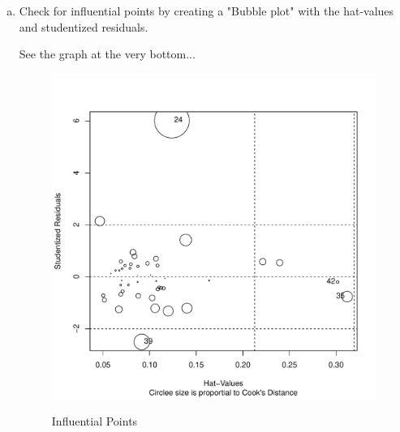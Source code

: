 \documentclass[12pt,letterpaper]{article}
\begin{document}
\begin{enumerate}[(a)]
\item Check for influential points by creating a "Bubble plot" with the hat-values and studentized residuals.\\
	\vspace{.25cm}
	  
	See the graph at the very bottom...
	\begin{figure}[h!]\centering
		\caption{\footnotesize Influential Points}\vspace{-1cm}
		\label{fig:e}
		\includegraphics[width=.85\textwidth]{e.pdf}\\
	\end{figure}

\end{enumerate}
\end{document}
